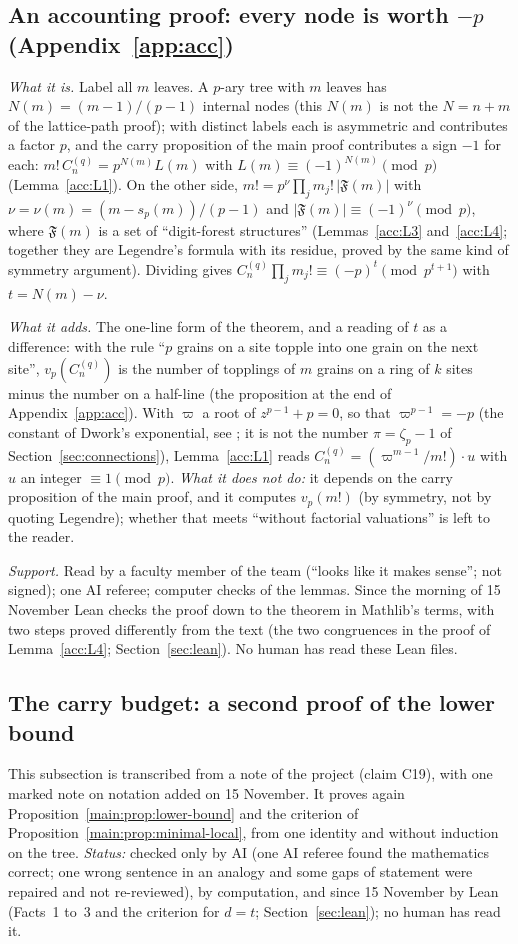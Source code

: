 \documentclass[11pt]{article}
\theoremstyle{definition}
\theoremstyle{remark}
\numberwithin{equation}{section}
\numberwithin{figure}{section}
\newcommand{\F}{\mathfrak F}
\begin{document}
\subsection{An accounting proof: every node is worth $-p$ (Appendix~\ref{app:acc})}
\emph{What it is.} Label all $m$ leaves. A $p$-ary tree with $m$ leaves has $N(m)=(m-1)/(p-1)$ internal nodes
(this $N(m)$ is not the $N=n+m$ of the lattice-path proof);
with distinct labels each is asymmetric and contributes a factor $p$, and the carry proposition of the main
proof contributes a sign $-1$ for each: $m!\,C_n^{(q)}=p^{N(m)}L(m)$ with $L(m)\equiv(-1)^{N(m)}\pmod p$
(Lemma~\ref{acc:L1}). On the other side, $m!=p^{\nu}\prod_jm_j!\,|\F(m)|$ with $\nu=\nu(m)=(m-s_p(m))/(p-1)$ and
$|\F(m)|\equiv(-1)^{\nu}\pmod p$, where $\F(m)$ is a set of ``digit-forest structures''
(Lemmas~\ref{acc:L3} and~\ref{acc:L4}; together they are Legendre's formula with its residue, proved by the
same kind of symmetry argument). Dividing gives $C_n^{(q)}\prod_jm_j!\equiv(-p)^{t}\pmod{p^{t+1}}$ with
$t=N(m)-\nu$.

\emph{What it adds.} The one-line form of the theorem, and a reading of $t$ as a difference: with the rule
``$p$ grains on a site topple into one grain on the next site'', $v_p(C_n^{(q)})$ is the number of topplings of
$m$ grains on a ring of $k$ sites minus the number on a half-line (the proposition at the end of
Appendix~\ref{app:acc}). With $\varpi$ a root of $z^{p-1}+p=0$, so that $\varpi^{p-1}=-p$ (the constant of
Dwork's exponential, see \cite{Kochubei}; it is not the number $\pi=\zeta_p-1$ of
Section~\ref{sec:connections}), Lemma~\ref{acc:L1} reads $C_n^{(q)}=(\varpi^{m-1}/m!)\cdot u$ with $u$ an
integer $\equiv1\pmod p$. \emph{What it does not do:} it depends on the carry proposition of the main proof,
and it computes $v_p(m!)$ (by symmetry, not by quoting Legendre); whether that meets ``without factorial
valuations'' is left to the reader.

\emph{Support.} Read by a faculty member of the team (``looks like it makes sense''; not signed); one AI
referee; computer checks of the lemmas. Since the morning of 15 November Lean checks the proof down to the
theorem in Mathlib's terms, with two steps proved differently from the text (the two congruences in the proof
of Lemma~\ref{acc:L4}; Section~\ref{sec:lean}). No human has read these Lean files.

\subsection{The carry budget: a second proof of the lower bound}\label{sec:carrybudget}
This subsection is transcribed from a note of the project (claim C19), with one marked note on notation
added on 15 November. It proves again
Proposition~\ref{main:prop:lower-bound} and the criterion of Proposition~\ref{main:prop:minimal-local}, from
one identity and without induction on the tree. \emph{Status:} checked only by AI (one AI referee found the
mathematics correct; one wrong sentence in an analogy and some gaps of statement were repaired and not
re-reviewed), by computation, and since 15 November by Lean (Facts~1 to~3 and the criterion for
$d=t$; Section~\ref{sec:lean}); no human has read it.
\end{document}
